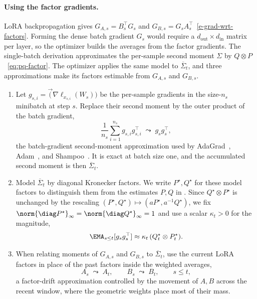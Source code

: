 \paragraph{Using the factor gradients.} LoRA backpropagation gives
$G_{A,s}=B_s^\top G_s$ and
$G_{B,s}=G_sA_s^\top$~\eqref{e-grad-wrt-factors}. Forming the dense batch
gradient $G_s$ would require a $d_{\mathrm{out}}\times d_{\mathrm{in}}$
matrix per layer, so the optimizer builds the averages from the factor
gradients. The single-batch derivation approximates the per-sample second
moment $\Sigma$ by $Q\otimes P$~\eqref{eq:pq-factor}. The optimizer applies
the same model to $\overline{\Sigma}_t$, and three approximations make its
factors estimable from $G_{A,s}$ and $G_{B,s}$.
\begin{enumerate}[leftmargin=1.6em,itemsep=2pt,topsep=2pt]
  \item Let
  $g_{s,i}=\vec(\nabla\ell_{x_{s,i}}(W_s))$ be the per-sample gradients in
  the size-$n_s$ minibatch at step $s$. Replace their second moment by the
  outer product of the batch gradient,
  \[
    \frac1{n_s}\sum_{i=1}^{n_s}g_{s,i}g_{s,i}^\top
    \;\leadsto\;
    g_sg_s^\top ,
  \]
  the batch-gradient second-moment approximation used by
  AdaGrad~\cite{adagrad}, Adam~\cite{adam}, and Shampoo~\cite{shampoo}.
  It is exact at batch size one, and the accumulated second moment is then
  $\overline{\Sigma}_t$.
  \item Model $\overline{\Sigma}_t$ by diagonal Kronecker factors. We write
  $P^\star,Q^\star$ for these model factors to distinguish them from the
  estimates $P,Q$ in . Since
  $Q^\star\otimes P^\star$ is unchanged by the
  rescaling $(P^\star,Q^\star)\mapsto(aP^\star,a^{-1}Q^\star)$, we fix
  $\norm{\diag P^\star}_\infty=\norm{\diag Q^\star}_\infty=1$ and use a
  scalar $\kappa_t>0$ for the magnitude,
  \begin{equation}\label{e-diag-kron-second-mom-model-m7}
    \EMA_{s \leq t}[g_sg_s^\top]\approx\kappa_t\,(Q^\star_t\otimes P^\star_t).
  \end{equation}
  \item When relating moments of $G_{A,s}$ and $G_{B,s}$ to $\overline{\Sigma}_t$, use
  the current LoRA factors in place of the past factors inside the weighted
  averages,
  \[
    A_s\;\leadsto\;A_t,\qquad B_s\;\leadsto\;B_t,\qquad s\le t,
  \]
  a factor-drift approximation controlled by the movement of $A,B$ across the
  recent window, where the geometric weights place most of their mass.
\end{enumerate}

